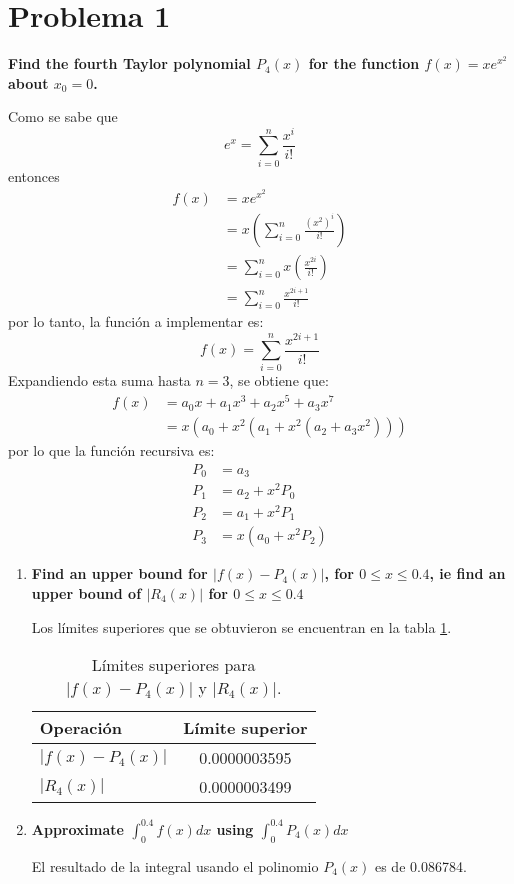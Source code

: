 \section*{Problema 1}
\textbf{Find the fourth Taylor polynomial $P_4(x)$ for the function $f (x) = xe^{x^2}$ about $x_0 = 0$.}

Como se sabe que
\begin{equation*}
    e^x= \sum_{i=0}^n \frac{x^i}{i!}
\end{equation*}
entonces
\begin{align*}
    f(x) & =xe^{x^2}                                       \\
         & =x \left(\sum_{i=0}^n \frac{(x^2)^i}{i!}\right) \\
         & =  \sum_{i=0}^n x\left(\frac{x^{2i}}{i!}\right) \\
         & = \sum_{i=0}^n \frac{x^{2i+1}}{i!}
\end{align*}
por lo tanto, la función a implementar es:
\begin{equation*}
    f(x)= \sum_{i=0}^n \frac{x^{2i+1}}{i!}
\end{equation*}
Expandiendo esta suma hasta $n=3$, se obtiene que:
\begin{align*}
    f(x) & = a_0 x + a_1 x^3 + a_2 x^5 + a_3x^7 \\
         & = x(a_0 + x^2(a_1+x^2(a_2+a_3x^2)))
\end{align*}
por lo que la función recursiva es:
\begin{align*}
    P_0 & = a_3            \\
    P_1 & = a_2+x^2P_0     \\
    P_2 & = a_1+x^2P_1     \\
    P_3 & = x(a_0 +x^2P_2)
\end{align*}
\begin{enumerate}
    \item \textbf{Find an upper bound for $|f (x)-P_4 (x)|$, for $0 \leq x \leq 0.4$, ie find an upper bound of $|R_4 (x)|$ for $0 \leq x \leq 0.4$}

          Los límites superiores que se obtuvieron se encuentran en la tabla \ref{table:problema1}.
          \begin{table}[H]
              \centering
              \begin{tabular}{lc} \hline
                  \textbf{Operación} & \textbf{Límite superior} \\ \hline
                  $|f(x)-P_4(x)|$    & 0.0000003595             \\
                  $|R_4(x)|$         & 0.0000003499             \\ \hline
              \end{tabular}
              \caption{Límites superiores para $|f(x)-P_4(x)|$ y $|R_4(x)|$.}
              \label{table:problema1}
          \end{table}
    \item \textbf{Approximate $\int_0^{0.4} f(x)dx$ using $\int_0^{0.4} P_4(x)dx$}

          El resultado de la integral usando el polinomio $P_4(x)$ es de 0.086784.
\end{enumerate}
